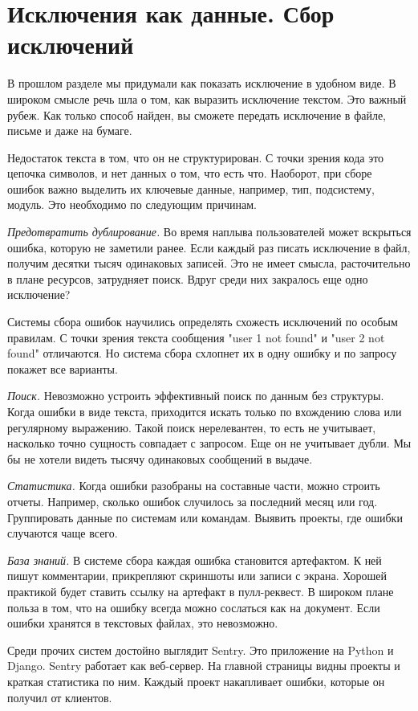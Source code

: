 \section{Исключения как данные. Сбор исключений}

В прошлом разделе мы придумали как показать исключение в удобном виде. В широком
смысле речь шла о том, как выразить исключение текстом. Это важный рубеж. Как
только способ найден, вы сможете передать исключение в файле, письме и даже на
бумаге.

Недостаток текста в том, что он не структурирован. С точки зрения кода это
цепочка символов, и нет данных о том, что есть что. Наоборот, при сборе ошибок
важно выделить их ключевые данные, например, тип, подсистему, модуль. Это
необходимо по следующим причинам.

\emph{Предотвратить дублирование.} Во время наплыва пользователей может вскрыться
ошибка, которую не заметили ранее. Если каждый раз писать исключение в файл,
получим десятки тысяч одинаковых записей. Это не имеет смысла, расточительно в
плане ресурсов, затрудняет поиск. Вдруг среди них закралось еще одно исключение?

Системы сбора ошибок научились определять схожесть исключений по особым
правилам. С точки зрения текста сообщения "user 1 not found" и "user 2 not
found" отличаются. Но система сбора схлопнет их в одну ошибку и по запросу
покажет все варианты.

\emph{Поиск.} Невозможно устроить эффективный поиск по данным без структуры. Когда
ошибки в виде текста, приходится искать только по вхождению слова или
регулярному выражению. Такой поиск нерелевантен, то есть не учитывает, насколько
точно сущность совпадает с запросом. Еще он не учитывает дубли. Мы бы не хотели
видеть тысячу одинаковых сообщений в выдаче.

\emph{Статистика.} Когда ошибки разобраны на составные части, можно строить
отчеты. Например, сколько ошибок случилось за последний месяц или
год. Группировать данные по системам или командам. Выявить проекты, где ошибки
случаются чаще всего.

\emph{База знаний.} В системе сбора каждая ошибка становится артефактом. К ней
пишут комментарии, прикрепляют скриншоты или записи с экрана. Хорошей практикой
будет ставить ссылку на артефакт в пулл-реквест. В широком плане польза в том,
что на ошибку всегда можно сослаться как на документ. Если ошибки хранятся в
текстовых файлах, это невозможно.

Среди прочих систем достойно выглядит Sentry. Это приложение на Python и
Django. Sentry работает как веб-сервер. На главной страницы видны проекты и
краткая статистика по ним. Каждый проект накапливает ошибки, которые он получил
от клиентов.


